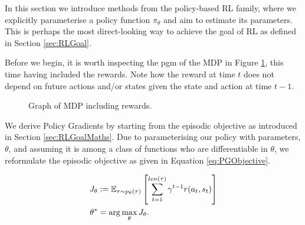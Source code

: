 \documentclass{report}
\numberwithin{equation}{section}
\numberwithin{figure}{section}
\numberwithin{table}{section}
\numberwithin{algorithm}{section}
\begin{document}
In this section we introduce methods from 
the policy-based RL family, where we explicitly 
parameterise a policy function 
$\pi_\theta$ and aim to estimate its parameters. This is perhaps 
the most direct-looking way to achieve the goal of RL as defined 
in Section \ref{sec:RLGoal}.

Before we begin, it is worth inspecting the pgm of the MDP
in Figure \ref{fig:MDPRew}, 
this time having included the rewards. Note how the reward 
at time $t$ does not depend on future actions and/or states 
given the state and action at time $t-1$.
\begin{figure}[H]
  \centering
  \caption{\label{fig:MDPRew} Graph of MDP including rewards.}
\end{figure}

We derive Policy Gradients \citep{REINFORCE} 
by starting from the episodic objective as introduced in Section 
\ref{sec:RLGoalMaths}. Due to parameterising our policy 
with parameters, $\theta$, and assuming it is among a 
class of functions who are 
differentiable in $\theta$, we reformulate the episodic 
objective as given in Equation \ref{eq:PGObjective}.

\begin{align}\label{eq:PGObjective}
  J_\theta&:=\mathbb{E}_{\tau\sim p_{\theta}(\tau)}
   \left[
    \sum_{t=1}^{len(\tau)}\gamma^{t-1}r(a_t, s_t)\right]\notag\\ 
  \theta^*&=\arg \max_{\theta}J_\theta.
\end{align}
\end{document}
